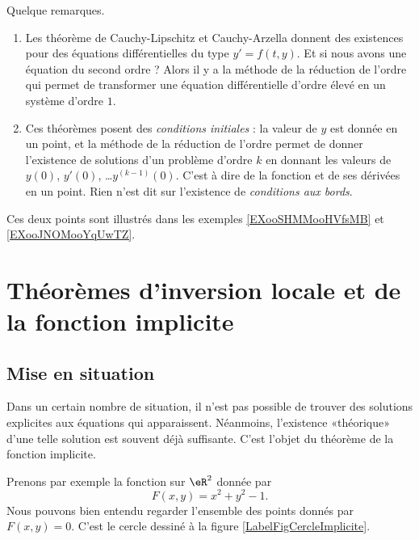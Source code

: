 \begin{remark}
    Quelque remarques.
    \begin{enumerate}
        \item
    Les théorème de Cauchy-Lipschitz et Cauchy-Arzella donnent des existences pour des équations différentielles du type \( y'=f(t,y)\). Et si nous avons une équation du second ordre ? Alors il y a la méthode de la réduction de l'ordre qui permet de transformer une équation différentielle d'ordre élevé en un système d'ordre \( 1\).
\item
    Ces théorèmes posent des \emph{conditions initiales} : la valeur de \( y\) est donnée en un point, et la méthode de la réduction de l'ordre permet de donner l'existence de solutions d'un problème d'ordre \( k\) en donnant les valeurs de \( y(0)\), \( y'(0)\), \ldots \( y^{(k-1)}(0)\). C'est à dire de la fonction et de ses dérivées en un point. Rien n'est dit sur l'existence de \emph{conditions aux bords}.
    \end{enumerate}
    Ces deux points sont illustrés dans les exemples \ref{EXooSHMMooHVfsMB} et \ref{EXooJNOMooYqUwTZ}.
\end{remark}

                    \section{Théorèmes d'inversion locale et de la fonction implicite}

\subsection{Mise en situation}

Dans un certain nombre de situation, il n'est pas possible de trouver des solutions explicites aux équations qui apparaissent. Néanmoins, l'existence «théorique» d'une telle solution est souvent déjà suffisante. C'est l'objet du théorème de la fonction implicite.

Prenons par exemple la fonction sur $\eR^2$ donnée par 
\begin{equation}
    F(x,y)=x^2+y^2-1.
\end{equation}
Nous pouvons bien entendu regarder l'ensemble des points donnés par $F(x,y)=0$. C'est le cercle dessiné à la figure \ref{LabelFigCercleImplicite}.
\newcommand{\CaptionFigCercleImplicite}{Un cercle pour montrer l'intérêt de la fonction implicite. Si on donne \( x\), nous ne pouvons pas savoir si nous parlons de \( P\) ou de \( P'\).}



